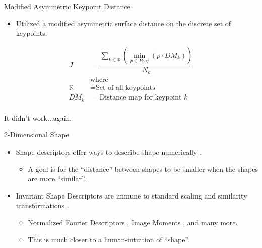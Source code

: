 \documentclass[presentation, aspectratio=1610]{beamer}
\begin{document}
\begin{frame}[label={sec:org5402ec2}]{Modified Asymmetric Keypoint Distance}
\begin{itemize}
\item Utilized a modified asymmetric surface distance on the discrete set of keypoints.
\end{itemize}

\begin{equation}
  \label{eq:curv-keypoint}
  \begin{split}
    \displaystyle J &= \dfrac{\sum_{k \in \mathbb{K}}(\min_{p\in Proj}(p \cdot DM_{k}))}{N_k} \\
      &\text{where}\\
    \mathbb{K} &= \text{Set of all keypoints} \\
    DM_{k} &= \text{Distance map for keypoint $k$} \\
  \end{split}
\end{equation}

{\tiny It didn't work...again.}
\end{frame}
\begin{frame}[label={sec:orgdbc0f5b}]{2-Dimensional Shape}
\begin{itemize}
\item \alert{Shape descriptors} offer ways to describe shape numerically \autocites{zhangReviewShapeRepresentation2004}[][]{flusserInvariantShapeDescription1992}.
\begin{itemize}
\item A goal is for the ``distance'' between shapes to be smaller when the shapes are more ``similar''.
\end{itemize}
\item \alert{Invariant Shape Descriptors} are immune to standard scaling and similarity transformations \autocites{loweDistinctiveImageFeatures2004}[][]{khotanzadInvariantImageRecognition1990}.
\begin{itemize}
\item Normalized Fourier Descriptors \autocites{persoonShapeDiscriminationUsing1977}[][]{linClassificationPartial2D1987}[][]{wallaceEfficientThreedimensionalAircraft1980}[][]{wallaceAnalysisThreedimensionalMovement1980}[][]{banksAccurateMeasurementThreedimensional1996}, Image Moments \autocites{kimRegionbasedShapeDescriptor2000}[][]{khotanzadInvariantImageRecognition1990}, and many more.
\item This is much closer to a human-intuition of ``shape''.
\end{itemize}
\end{itemize}
\end{frame}
\end{document}
